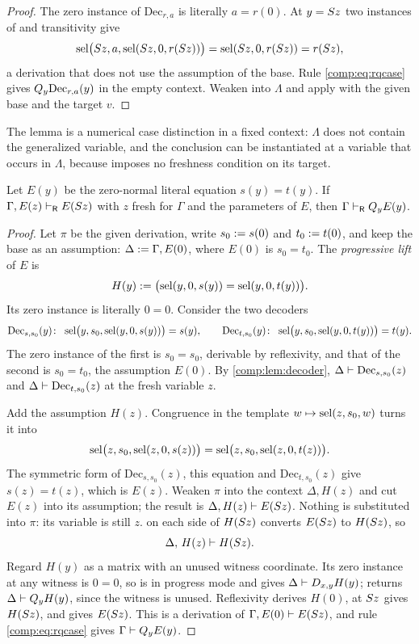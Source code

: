 \begin{proof}
The zero instance of $\mathrm{Dec}_{r,a}$ is literally $a=r(0)$. At $y=S z$ two
instances of  and transitivity give
\[
 \operatorname{sel}\bigl(S z,a,\operatorname{sel}(S z,0,r(S z))\bigr)
 =\operatorname{sel}(S z,0,r(S z))=r(S z),
\]
a derivation that does not use the assumption of the base. Rule
\eqref{comp:eq:rqcase} gives $Q_{y}\mathrm{Dec}_{r,a}(y)$ in the empty context.
Weaken into $\Lambda$ and apply  with the given base and the
target $v$.
\end{proof}

The lemma is a numerical case distinction in a fixed context: $\Lambda$ does
not contain the generalized variable, and the conclusion can be instantiated
at a variable that occurs in $\Lambda$, because  imposes no
freshness condition on its target.

\begin{theorem}
\label{comp:thm:rprogress}
Let $E(y)$ be the zero-normal literal equation $s(y)=t(y)$. If
$\Gamma,E(z)\vdash_{\mathsf R}E(S z)$ with $z$ fresh for $\Gamma$ and
the parameters of $E$, then $\Gamma\vdash_{\mathsf R}Q_{y}E(y)$.
\end{theorem}

\begin{proof}
Let $\pi$ be the given derivation, write $s_0\mathrel{:=} s(0)$ and
$t_0\mathrel{:=} t(0)$, and keep the base as an assumption:
$\Delta\mathrel{:=}\Gamma,E(0)$, where $E(0)$ is $s_0=t_0$. The \emph{progressive
lift} of $E$ is
\[
 H(y)\mathrel{:=}\bigl(\operatorname{sel}(y,0,s(y))=\operatorname{sel}(y,0,t(y))\bigr).
\]
Its zero instance is literally $0=0$. Consider the two decoders
\[
 \mathrm{Dec}_{s,s_0}(y)\colon\ \sel\bigl(y,s_0,\sel(y,0,s(y))\bigr)=s(y),
 \qquad
 \mathrm{Dec}_{t,s_0}(y)\colon\ \sel\bigl(y,s_0,\sel(y,0,t(y))\bigr)=t(y).
\]
The zero instance of the first is $s_0=s_0$, derivable by reflexivity, and
that of the second is $s_0=t_0$, the assumption $E(0)$. By
\cref{comp:lem:decoder}, $\Delta\vdash\mathrm{Dec}_{s,s_0}(z)$ and
$\Delta\vdash\mathrm{Dec}_{t,s_0}(z)$ at the fresh variable $z$.

Add the assumption $H(z)$. Congruence in the template
$w\mapsto\operatorname{sel}(z,s_0,w)$ turns it into
\[
 \operatorname{sel}\bigl(z,s_0,\operatorname{sel}(z,0,s(z))\bigr)=\operatorname{sel}\bigl(z,s_0,\operatorname{sel}(z,0,t(z))\bigr).
\]
The symmetric form of $\mathrm{Dec}_{s,s_0}(z)$, this equation and
$\mathrm{Dec}_{t,s_0}(z)$ give $s(z)=t(z)$, which is $E(z)$. Weaken $\pi$ into the
context $\Delta,H(z)$ and cut $E(z)$ into its assumption; the result is
$\Delta,H(z)\vdash E(S z)$. Nothing is substituted into $\pi$: its
variable is still $z$.  on each side of $H(S z)$ converts
$E(S z)$ to $H(S z)$, so
\[
 \Delta,\,H(z)\vdash H(S z).
\]
Regard $H(y)$ as a matrix with an unused witness coordinate. Its zero
instance at any witness is $0=0$, so  is in progress mode and
gives $\Delta\vdash D_{x,y}H(y)$;  returns
$\Delta\vdash Q_{y}H(y)$, since the witness is unused. Reflexivity derives
$H(0)$,  at $S z$ gives $H(S z)$, and 
gives $E(S z)$. This is a derivation of
$\Gamma,E(0)\vdash E(S z)$, and rule \eqref{comp:eq:rqcase} gives
$\Gamma\vdash Q_{y}E(y)$.
\end{proof}


